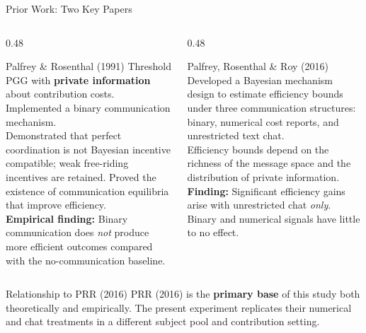\documentclass[aspectratio=169,10pt]{beamer}
\begin{document}
\begin{frame}{Prior Work: Two Key Papers}

\begin{columns}[T]
  \begin{column}{0.48\textwidth}
    \begin{block}{Palfrey \& Rosenthal (1991)}
      \small
      Threshold PGG with \textbf{private information} about contribution costs.
      Implemented a binary communication mechanism.\\[0.4em]
      Demonstrated that perfect coordination is not Bayesian incentive compatible;
      weak free-riding incentives are retained.
      Proved the existence of communication equilibria that improve efficiency.\\[0.4em]
      \textbf{Empirical finding:} Binary communication does \emph{not} produce more efficient outcomes
      compared with the no-communication baseline.
    \end{block}
  \end{column}
  \begin{column}{0.48\textwidth}
    \begin{block}{Palfrey, Rosenthal \& Roy (2016)}
      \small
      Developed a Bayesian mechanism design to estimate efficiency bounds under three communication structures:
      binary, numerical cost reports, and unrestricted text chat.\\[0.4em]
      Efficiency bounds depend on the richness of the message space
      and the distribution of private information.\\[0.4em]
      \textbf{Finding:} Significant efficiency gains arise with unrestricted chat \emph{only}.
      Binary and numerical signals have little to no effect.
    \end{block}
  \end{column}
\end{columns}

\vspace{0.4em}
\begin{block}{Relationship to PRR (2016)}
  \small
  PRR (2016) is the \textbf{primary base} of this study both theoretically and empirically.
  The present experiment replicates their numerical and chat treatments
  in a different subject pool and contribution setting.
\end{block}

\end{frame}
\end{document}
